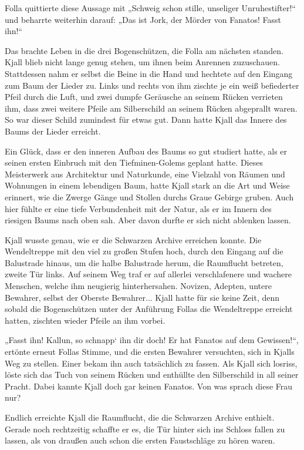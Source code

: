 \documentclass[10pt, a4paper, oneside]{book}
\begin{document}
Folla quittierte diese Aussage mit „Schweig schon stille, unseliger Unruhestifter!“ und beharrte weiterhin darauf: „Das ist Jork, der Mörder von Fanatos! Fasst ihn!“

Das brachte Leben in die drei Bogenschützen, die Folla am nächsten standen. Kjall blieb nicht lange genug stehen, um ihnen beim Anrennen zuzuschauen. Stattdessen nahm er selbst die Beine in die Hand und hechtete auf den Eingang zum Baum der Lieder zu. Links und rechts von ihm zischte je ein weiß befiederter Pfeil durch die Luft, und zwei dumpfe Geräusche an seinem Rücken verrieten ihm, dass zwei weitere Pfeile am Silberschild an seinem Rücken abgeprallt waren. So war dieser Schild zumindest für etwas gut. Dann hatte Kjall das Innere des Baums der Lieder erreicht.

Ein Glück, dass er den inneren Aufbau des Baums so gut studiert hatte, als er seinen ersten Einbruch mit den Tiefminen-Golems geplant hatte. Dieses Meisterwerk aus Architektur und Naturkunde, eine Vielzahl von Räumen und Wohnungen in einem lebendigen Baum, hatte Kjall stark an die Art und Weise erinnert, wie die Zwerge Gänge und Stollen durchs Graue Gebirge gruben. Auch hier fühlte er eine tiefe Verbundenheit mit der Natur, als er im Innern des riesigen Baums nach oben sah. Aber davon durfte er sich nicht ablenken lassen.

Kjall wusste genau, wie er die Schwarzen Archive erreichen konnte. Die Wendeltreppe mit den viel zu großen Stufen hoch, durch den Eingang auf die Balustrade hinaus, um die halbe Balustrade herum, die Raumflucht betreten, zweite Tür links. Auf seinem Weg traf er auf allerlei verschlafenere und wachere Menschen, welche ihm neugierig hinterhersahen. Novizen, Adepten, untere Bewahrer, selbst der Oberste Bewahrer... Kjall hatte für sie keine Zeit, denn sobald die Bogenschützen unter der Anführung Follas die Wendeltreppe erreicht hatten, zischten wieder Pfeile an ihm vorbei.

„Fasst ihn! Kallun, so schnapp‘ ihn dir doch! Er hat Fanatos auf dem Gewissen!“, ertönte erneut Follas Stimme, und die ersten Bewahrer versuchten, sich in Kjalls Weg zu stellen. Einer bekam ihn auch tatsächlich zu fassen. Als Kjall sich losriss, löste sich das Tuch von seinem Rücken und enthüllte den Silberschild in all seiner Pracht. Dabei kannte Kjall doch gar keinen Fanatos. Von was sprach diese Frau nur?

Endlich erreichte Kjall die Raumflucht, die die Schwarzen Archive enthielt. Gerade noch rechtzeitig schaffte er es, die Tür hinter sich ins Schloss fallen zu lassen, als von draußen auch schon die ersten Faustschläge zu hören waren.
\end{document}
